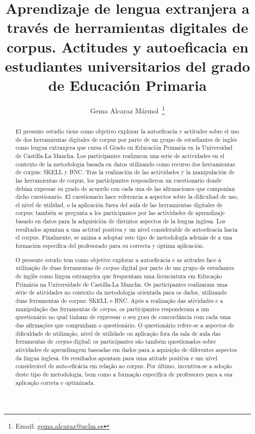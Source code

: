 \documentclass[spanish]{textolivre}
\title{Aprendizaje de lengua extranjera a través de herramientas digitales de corpus. Actitudes y autoeficacia en estudiantes universitarios del grado de Educación Primaria}
\author[1]{Gema Alcaraz Mármol~\orcid{0000-0001-7703-3829}\thanks{Email: \href{mailto:gema.alcaraz@uclm.es}{gema.alcaraz@uclm.es}}}
\affil[1]{Universidad de Castilla-La Mancha,  Departamento de Filología Moderna, Toledo, España.}
\begin{document}
\maketitle
\begin{polyabstract}
\begin{abstract}
El presente estudio tiene como objetivo explorar la
autoeficacia y actitudes sobre el uso de dos herramientas digitales de
corpus por parte de un grupo de estudiantes de inglés como lengua
extranjera que cursa el Grado en Educación Primaria en la Universidad de
Castilla-La Mancha. Los participantes realizaron una serie de
actividades en el contexto de la metodología basada en datos utilizando
como recurso dos herramientas de corpus: SKELL y BNC. Tras la
realización de las actividades y la manipulación de las herramientas de
corpus, los participantes respondieron un cuestionario donde debían
expresar su grado de acuerdo con cada una de las afirmaciones que
componían dicho cuestionario. El cuestionario hace referencia a aspectos
sobre la dificultad de uso, el nivel de utilidad, o la aplicación fuera
del aula de las herramientas digitales de corpus; también se pregunta a
los participantes por las actividades de aprendizaje basado en datos
para la adquisición de distintos aspectos de la lengua inglesa. Los
resultados apuntan a una actitud positiva y un nivel considerable de
autoeficacia hacia el corpus. Finalmente, se anima a adoptar este tipo
de metodología además de a una formación específica del profesorado para
su correcta y óptima aplicación.

\end{abstract}

\begin{portuguese}
\begin{abstract}
O presente estudo tem como objetivo explorar a autoeficácia e
as atitudes face à utilização de duas ferramentas de \textit{corpus} digital por parte de um grupo de estudantes de inglês como língua estrangeira que
frequentam uma licenciatura em Educação Primária na Universidade de
Castilla-La Mancha. Os participantes realizaram uma série de atividades
no contexto da metodologia orientada para os dados, utilizando duas
ferramentas de corpus: SKELL e BNC. Após a realização das atividades e
a manipulação das ferramentas de \textit{corpus}, os participantes responderam a um questionário no qual tinham de expressar o seu grau de concordância com cada uma das afirmações que compunham o questionário. O questionário refere-se a aspectos de dificuldade de utilização, nível de utilidade ou aplicação fora da sala de aula das ferramentas de \textit{corpus} digital; os participantes são também questionados sobre atividades de aprendizagem baseadas em dados para a aquisição de diferentes aspectos da língua inglesa. Os resultados apontam para uma atitude positiva e um nível considerável de auto-eficácia em relação ao corpus. Por último,
incentiva-se a adoção deste tipo de metodologia, bem como a formação
específica de professores para a sua aplicação correta e optimizada.


\end{abstract}
\end{portuguese}
\end{polyabstract}
\end{document}
